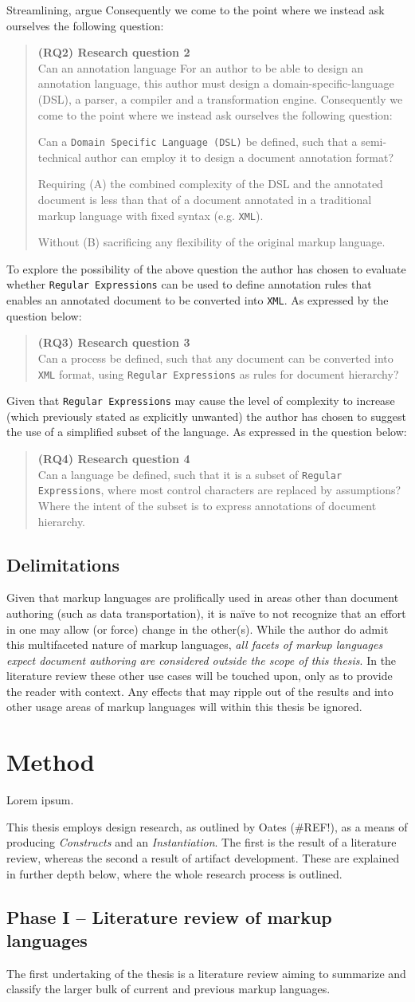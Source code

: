 \documentclass{scrreprt}
\newcommand\researchquestionformat[1]{\begin{quote}#1\end{quote}}
\newcommand\secondresearchquestion{\researchquestionformat{%
  \textbf{(RQ2) Research question 2} \\
  Can an annotation language
  For an author to be able to design an annotation language, this author must design a domain-specific-language (DSL), a parser, a compiler and a transformation engine. Consequently we come to the point where we instead ask ourselves the following question:


  Can a \texttt{Domain Specific Language (DSL)} be defined, such that a semi-technical author can employ it to design a document annotation format?

  Requiring (A) the combined complexity of the DSL and the annotated document is less than that of a document annotated in a traditional markup language with fixed syntax (e.g. \texttt{XML}).

  Without (B) sacrificing any flexibility of the original markup language.
}}
\newcommand\thirdresearchquestion{\researchquestionformat{%
  \textbf{(RQ3) Research question 3} \\
  Can a process be defined, such that any document can be converted into \texttt{XML} format, using \texttt{Regular Expressions} as rules for document hierarchy?
}}
\newcommand\fourthresearchquestion{\researchquestionformat{%
  \textbf{(RQ4) Research question 4} \\
  Can a language be defined, such that it is a subset of \texttt{Regular Expressions}, where most control characters are replaced by assumptions? Where the intent of the subset is to express annotations of document hierarchy.
}}
\begin{document}
Streamlining,   argue  Consequently we come to the point where we instead ask ourselves the following question:

\secondresearchquestion

To explore the possibility of the above question the author has chosen to evaluate whether \texttt{Regular Expressions} can be used to define annotation rules that enables an annotated document to be converted into \texttt{XML}. As expressed by the question below:

\thirdresearchquestion

Given that \texttt{Regular Expressions} may cause the level of complexity to increase (which previously stated as explicitly unwanted) the author has chosen to suggest the use of a simplified subset of the language. As expressed in the question below:

\fourthresearchquestion


\section{Delimitations}
Given that markup languages are prolifically used in areas other than document authoring (such as data transportation), it is naïve to not recognize that an effort in one may allow (or force) change in the other(s). While the author do admit this multifaceted nature of markup languages, \emph{all facets of markup languages expect document authoring are considered outside the scope of this thesis}. In the literature review these other use cases will be touched upon, only as to provide the reader with context. Any effects that may ripple out of the results and into other usage areas of markup languages will within this thesis be ignored. 




\chapter{Method}
Lorem ipsum.

This thesis employs design research, as outlined by Oates (\#REF!), as a means of producing \emph{Constructs} and an \emph{Instantiation}. The first is the result of a literature review, whereas the second a result of artifact development. These are explained in further depth below, where the whole research process is outlined.


\section{Phase I -- Literature review of markup languages}
The first undertaking of the thesis is a literature review aiming to summarize and classify the larger bulk of current and previous markup languages.
\end{document}

